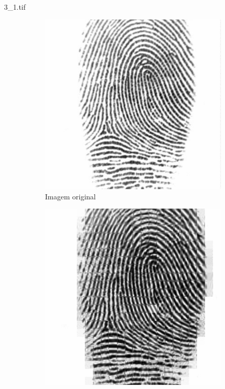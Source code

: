 \documentclass{beamer}
\begin{document}
    \begin{frame}{3\_1.tif}
        \begin{figure}
            \centering
            \begin{subfigure}[!ht]{0.32\textwidth}
                \includegraphics[width=\columnwidth]{Fingerprints/3_1.jpg}
                \caption{Imagem original}
            \end{subfigure}
            \begin{subfigure}[!ht]{0.32\textwidth}
                \includegraphics[width=\columnwidth]{Fingerprints/3_1_intermediate.jpg}

\end{subfigure}
\end{figure}
\end{frame}
\end{document}
